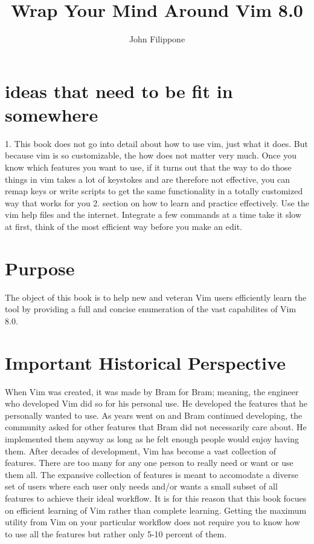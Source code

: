 \documentclass[12pt]{book}
\title{Wrap Your Mind Around Vim 8.0}
\author{John Filippone}
\begin{document}
\maketitle

\section{ideas that need to be fit in somewhere}
1. This book does not go into detail about how to use vim, just what it does.
But because vim is so customizable, the how does not matter very much.
Once you know which features you want to use, if it turns out that the way to do those things in vim takes a lot of keystokes and are therefore
not effective, you can remap keys or write scripts to get the same functionality in a totally customized way that works for you
2. section on how to learn and practice effectively.
Use the vim help files and the internet.
Integrate a few commands at a time take it slow at first, think of the most efficient way before you make an edit.

\section{Purpose}
The object of this book is to help new and veteran Vim users efficiently learn the tool by providing a full and concise enumeration of the vast capabilites of Vim 8.0.

\section{Important Historical Perspective}
When Vim was created, it was made by Bram for Bram; meaning, the engineer who developed Vim did so for his personal use.
He developed the features that he personally wanted to use.
As years went on and Bram continued developing, the community asked for other features that Bram did not necessarily care about.
He implemented them anyway as long as he felt enough people would enjoy having them.
After decades of development, Vim has become a vast collection of features.
There are too many for any one person to really need or want or use them all.
The expansive collection of features is meant to accomodate a diverse set of users where each user only needs and/or wants a small subset of all features to achieve their ideal workflow.
It is for this reason that this book focues on efficient learning of Vim rather than complete learning.
Getting the maximum utility from Vim on your particular workflow does not require you to know how to use all the features but rather only 5-10 percent of them.
\end{document}
